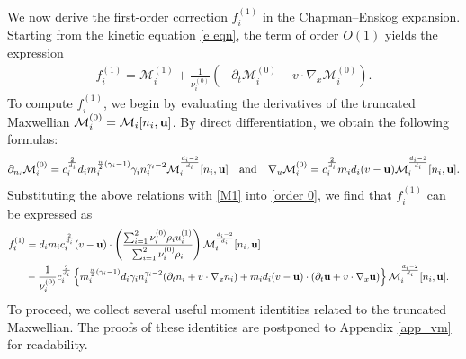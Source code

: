 \documentclass[10pt,reqno]{amsart}
\numberwithin{equation}{section}
\newcommand{\pa}{\partial}
\begin{document}
We now derive the first-order correction $f_i^{(1)}$ in the Chapman--Enskog expansion. Starting from the kinetic equation \eqref{e eqn}, the term of order $O(1)$ yields the expression
\begin{align}\label{order 0}
f_i^{(1)} =\mathcal{M}_i^{(1)}+ \frac{1}{\nu_i^{(0)}}\left(-\pa_t \mathcal{M}_i^{(0)} - v \cdot \nabla_x \mathcal{M}_i^{(0)}\right).
\end{align}
To compute $f_i^{(1)}$, we begin by evaluating the derivatives of the truncated Maxwellian $\mathcal{M}_i^{(0)} = \mathcal{M}_i[n_i, {\bf{u}}]$. By direct differentiation, we obtain the following formulas:
\[
\pa_{n_i} \mathcal{M}_i^{(0)} = c_i^{\frac{2}{d_i}} d_i m_i^{\frac{n}{2}(\gamma_i - 1)} \gamma_i n_i^{\gamma_i - 2} \mathcal{M}_i^{\frac{d_i - 2}{d_i}}[n_i,{\bf{u}}] \quad \mbox{and} \quad
\nabla_u \mathcal{M}_i^{(0)} = c_i^{\frac{2}{d_i}} m_i d_i (v - {\bf{u}}) \mathcal{M}_i^{\frac{d_i - 2}{d_i}}[n_i,{\bf{u}}].
\]
Substituting the above relations with \eqref{M1} into \eqref{order 0}, we find that $f_i^{(1)}$ can be expressed as
\begin{align}\label{f1}\begin{split}
f_i^{(1)} 
&= d_im_ic_i^{\frac{2}{d_i}}(v-{\bf{u}})\cdot \left( \frac{ \sum_{i=1}^2\nu_i^{(0)} \rho_iu_i^{(1)}}{\sum_{i=1}^2\nu_i^{(0)} \rho_i} \right)\mathcal{M}_i^{\frac{d_i-2}{d_i}}[n_i,{\bf{u}}]\cr 
&-\frac{1}{\nu_i^{(0)}}c_i^{\frac{2}{d_i}}\left\{ m_i^{\frac{n}{2}(\gamma_i - 1)} d_i \gamma_i n_i^{\gamma_i - 2}  (\pa_t n_i + v \cdot \nabla_x n_i) 
+  m_i d_i (v - {\bf{u}})  \cdot (\pa_t {\bf{u}} + v \cdot \nabla_x {\bf{u}})\right\}\mathcal{M}_i^{\frac{d_i - 2}{d_i}}[n_i,{\bf{u}}].
\end{split}\end{align}
To proceed, we collect several useful moment identities related to the truncated Maxwellian. The proofs of these identities are postponed to Appendix \ref{app_vm} for readability.
\end{document}
